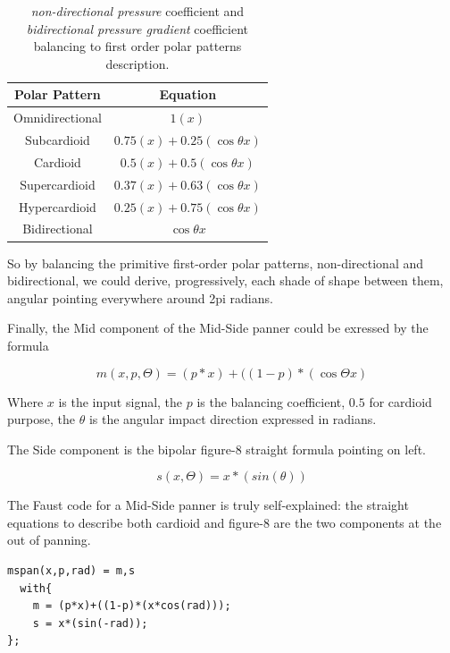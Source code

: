 \documentclass{article}
\begin{document}
\begin{table}[h]
 \begin{center}
 \begin{tabular}{cc}
  Polar Pattern & Equation \\
  \hline
  Omnidirectional & $ 1(x) $ \\
  Subcardioid     & $ 0.75(x) + 0.25(\cos\theta x) $ \\
  Cardioid        & $ 0.5(x) + 0.5(\cos\theta x) $ \\
  Supercardioid   & $ 0.37(x) + 0.63(\cos\theta x) $ \\
  Hypercardioid   & $ 0.25(x) + 0.75(\cos\theta x) $ \\
  Bidirectional   & $ \cos\theta x $ \\
 \end{tabular}
\end{center}
 \caption{\emph{non-directional pressure} coefficient and \emph{bidirectional pressure gradient} coefficient balancing to first order polar patterns description.}
 \label{tab:example}
\end{table}

So by balancing the primitive first-order polar patterns, non-directional and bidirectional, we could derive, progressively, each shade of shape between them, angular pointing everywhere around 2pi radians.

Finally, the Mid component of the Mid-Side panner could be exressed by the formula

\begin{equation}
m(x,p,\Theta) = (p*x) + ((1-p)*(\cos\Theta x)
\label{eq:mid}
\end{equation}

Where $x$ is the input signal, the $p$ is the balancing coefficient, $0.5$ for cardioid purpose, the $\theta$ is the angular impact direction expressed in radians.

The Side component is the bipolar figure-8 straight formula pointing on left.

\begin{equation}
s(x,\Theta) = x*(sin(\theta))
\label{eq:mid}
\end{equation}

The Faust code for a Mid-Side panner is truly self-explained: the straight equations to describe both cardioid and figure-8 are the two components at the out of panning.

\begin{lstlisting}
mspan(x,p,rad) = m,s
  with{
    m = (p*x)+((1-p)*(x*cos(rad)));
    s = x*(sin(-rad));
};
\end{lstlisting}
\end{document}
